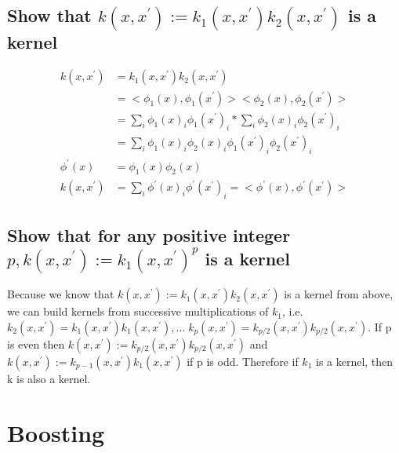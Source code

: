 \documentclass[11pt]{article}
\theoremstyle{quest}
\newcommand{\problem}[1]{\section{#1}}        %
\newcommand{\subproblem}[1]{\subsection{#1}}      %
\begin{document}
\subproblem{Show that $k(x, x^{'}) := k_1(x, x^{'})k_2(x, x^{'})$ is a kernel}
\begin{align*}
k(x, x^{'}) &= k_1(x, x^{'})k_2(x, x^{'}) \\
 			&= <\phi_1(x), \phi_1(x^{'})><\phi_2(x), \phi_2(x^{'})> \\
 			&= \sum_i{\phi_1(x)_i\phi_1(x^{'})_i} * \sum_i{\phi_2(x)_i\phi_2(x^{'})_i} \\
 			&= \sum_i{\phi_1(x)_i\phi_2(x)_i\phi_1(x^{'})_i\phi_2(x^{'})_i} \\
\phi^{'}(x) &= \phi_1(x)\phi_2(x) \\
k(x, x^{'}) &= \sum_i{ \phi^{'}(x)_i \phi^{'}(x^{'})_i} = <\phi^{'}(x), \phi^{'}(x^{'})> 
\end{align*}


\subproblem{Show that for any positive integer $p, k(x, x^{'}) := k_1(x, x^{'})^p$ is a kernel}
\begin{adjustwidth}{3.5em}{0em}
Because we know that $k(x, x^{'}) := k_1(x, x^{'})k_2(x, x^{'})$ is a kernel from above, we can build kernels from successive multiplications of $k_1$, i.e. $k_2(x, x^{'}) = k_1(x, x^{'})k_1(x, x^{'}), ...\; k_p(x, x^{'}) = k_{p/2}(x, x^{'})k_{p/2}(x, x^{'})$. If p is even then $k(x, x^{'}) := k_{p/2}(x, x^{'})k_{p/2}(x, x^{'})$ and $k(x, x^{'}) := k_{p-1}(x, x^{'})k_{1}(x, x^{'})$ if p is odd. Therefore if $k_1$ is a kernel, then k is also a kernel.
\end{adjustwidth}





\vspace{1em}
\problem{Boosting}
\end{document}
